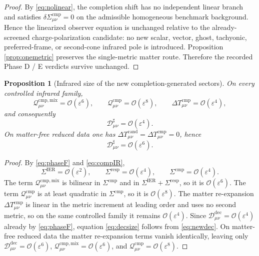 \documentclass[11pt]{article}
\newcommand{\BaseShift}{\Sigma^{\mathrm{IER}}}
\newcommand{\ResponseShift}{\Sigma^{\mathrm{resp}}}
\newcommand{\CompShift}{\Sigma^{\mathrm{cmp}}}
\newcommand{\DeltaTCand}{\Delta T_{\mu\nu}^{\mathrm{cand}}}
\newcommand{\DeltaTComp}{\Delta T_{\mu\nu}^{\mathrm{cmp}}}
\newcommand{\ResidualDec}{\mathcal D_{\mu\nu}^{\mathrm{dec}}}
\newcommand{\CompMix}{\mathcal Q_{\mu\nu}^{\mathrm{cmp,mix}}}
\newcommand{\CompQuad}{\mathcal Q_{\mu\nu}^{\mathrm{cmp}}}
\newcommand{\CompDec}{\mathcal D_{\mu\nu}^{\sharp}}
\newcommand{\epsIR}{\varepsilon}
\newtheorem{proposition}{Proposition}
\begin{document}
\begin{proof}
By \eqref{eq:nolinear}, the completion shift has no independent linear branch and satisfies \(\delta\CompShift_{\mu\nu}=0\) on the admissible homogeneous benchmark background. Hence the linearized observer equation is unchanged relative to the already-screened charge-polarization candidate: no new scalar, vector, ghost, tachyonic, preferred-frame, or second-cone infrared pole is introduced. Proposition \ref{prop:onemetric} preserves the single-metric matter route. Therefore the recorded Phase D / E verdicts survive unchanged.
\end{proof}

\begin{proposition}[Infrared size of the new completion-generated sectors]
\label{prop:size}
On every controlled infrared family,
\begin{equation}
\CompMix=\mathcal O(\epsIR^6),
\qquad
\CompQuad=\mathcal O(\epsIR^8),
\qquad
\DeltaTComp=\mathcal O(\epsIR^4),
\label{eq:sizes}
\end{equation}
and consequently
\begin{equation}
\CompDec=\mathcal O(\epsIR^4).
\label{eq:decsize}
\end{equation}
On matter-free reduced data one has \(\DeltaTCand=\DeltaTComp=0\), hence
\begin{equation}
\CompDec=\mathcal O(\epsIR^6).
\label{eq:mfsize}
\end{equation}
\end{proposition}

\begin{proof}
By \eqref{eq:phaseF} and \eqref{eq:compIR},
\[
\BaseShift=\mathcal O(\epsIR^2),
\qquad
\ResponseShift=\mathcal O(\epsIR^4),
\qquad
\CompShift=\mathcal O(\epsIR^4).
\]
The term \(\CompMix\) is bilinear in \(\CompShift\) and in \(\BaseShift+\ResponseShift\), so it is \(\mathcal O(\epsIR^6)\). The term \(\CompQuad\) is at least quadratic in \(\CompShift\), so it is \(\mathcal O(\epsIR^8)\). The matter re-expansion \(\DeltaTComp\) is linear in the metric increment at leading order and uses no second metric, so on the same controlled family it remains \(\mathcal O(\epsIR^4)\). Since \(\ResidualDec=\mathcal O(\epsIR^4)\) already by \eqref{eq:phaseF}, equation \eqref{eq:decsize} follows from \eqref{eq:newdec}. On matter-free reduced data the matter re-expansion terms vanish identically, leaving only \(\ResidualDec=\mathcal O(\epsIR^6)\), \(\CompMix=\mathcal O(\epsIR^6)\), and \(\CompQuad=\mathcal O(\epsIR^8)\).
\end{proof}
\end{document}
